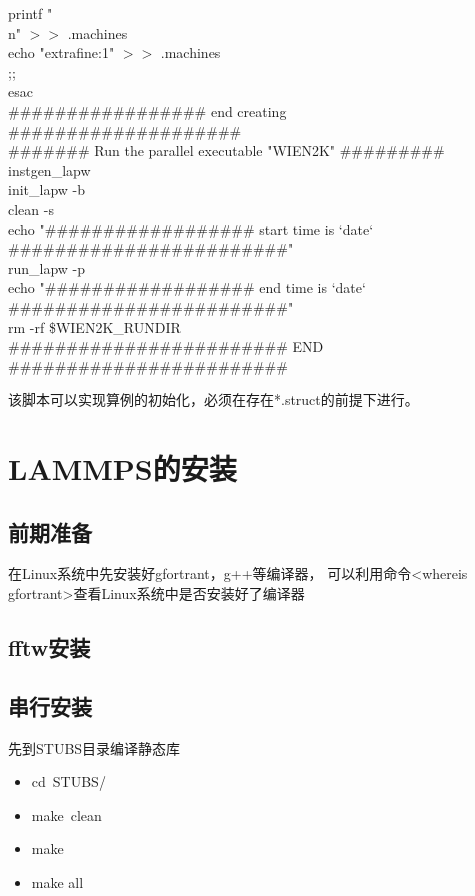 \documentclass[10pt,a4paper]{article}
\begin{document}
printf "\\n" $>>$ .machines \\
echo "extrafine:1" $>>$ .machines \\
;; \\
esac \\
\#\#\#\#\#\#\#\#\#\#\#\#\#\#\#\#\# end creating \#\#\#\#\#\#\#\#\#\#\#\#\#\#\#\#\#\#\#\# \\
\#\#\#\#\#\#\# Run the parallel executable "WIEN2K" \#\#\#\#\#\#\#\#\# \\
instgen\_lapw \\
init\_lapw -b \\
clean -s \\
echo "\#\#\#\#\#\#\#\#\#\#\#\#\#\#\#\#\#\# start time is `date` \#\#\#\#\#\#\#\#\#\#\#\#\#\#\#\#\#\#\#\#\#\#\#\#" \\
run\_lapw -p \\
echo "\#\#\#\#\#\#\#\#\#\#\#\#\#\#\#\#\#\# end time is `date` \#\#\#\#\#\#\#\#\#\#\#\#\#\#\#\#\#\#\#\#\#\#\#\#" \\
rm -rf \$WIEN2K\_RUNDIR \\
\#\#\#\#\#\#\#\#\#\#\#\#\#\#\#\#\#\#\#\#\#\#\#\# END \#\#\#\#\#\#\#\#\#\#\#\#\#\#\#\#\#\#\#\#\#\#\#\#

该脚本可以实现算例的初始化，必须在存在*.struct的前提下进行。

\section{\rm{LAMMPS}的安装}
\subsection{前期准备}
在\textrm{Linux}系统中先安装好\textrm{gfortrant}，\textrm{g++}等编译器， 可以利用命令\textrm{<whereis gfortrant>}查看\textrm{Linux}系统中是否安装好了编译器

\subsection{\rm{fftw}安装}

\subsection{串行安装}
先到\textrm{STUBS}目录编译静态库
\begin{itemize}
	\item \textrm{cd~STUBS/}
	\item \textrm{make~clean}
	\item \textrm{make}
	\item \textrm{make all}
\end{itemize}
\end{document}
